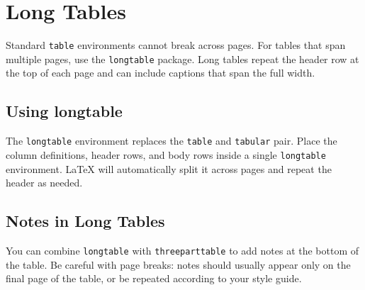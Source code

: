 \section{Long Tables}\label{ch6sec:longtables}

Standard \texttt{table} environments cannot break across pages. For tables that span multiple pages, use the \texttt{longtable} package. Long tables repeat the header row at the top of each page and can include captions that span the full width.

\begin{figure}[h]
\centering
{}
\label{ch6fig:bspline}
\end{figure}

\subsection{Using longtable}

The \texttt{longtable} environment replaces the \texttt{table} and \texttt{tabular} pair. Place the column definitions, header rows, and body rows inside a single \texttt{longtable} environment. \LaTeX{} will automatically split it across pages and repeat the header as needed.

\subsection{Notes in Long Tables}

You can combine \texttt{longtable} with \texttt{threeparttable} to add notes at the bottom of the table. Be careful with page breaks: notes should usually appear only on the final page of the table, or be repeated according to your style guide.

